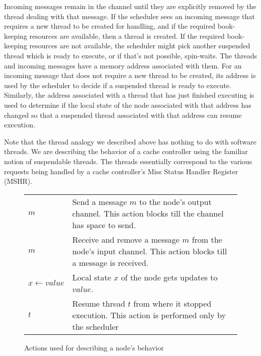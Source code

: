 Incoming messages remain in the channel until they are explicitly removed by
the thread dealing with that message. If the scheduler sees an incoming message
that requires a new thread to be created for handling, and if the required
book-keeping resources are available, then a thread is created.
If the
required book-keeping resources are not available, the scheduler might pick
another suspended thread which is ready to execute, or if that's not possible,
spin-waits.  The threads and incoming messages have a memory address associated
with them. For an incoming message that does not require a new thread to be
created, its address is used by the scheduler to decide if a suspended thread
is ready to execute. Similarly, the address associated with a thread that has
just finished executing is used to determine if the local state of the node
associated with that address has changed so that a suspended thread associated
with that address can resume execution.  

Note that the thread analogy we described above has nothing to do with software
threads. We are describing the behavior of a cache controller using the familiar
notion of suspendable threads. The threads essentially correspond to the various
requests being handled by a cache controller's Miss Status Handler Register
(MSHR).

\begin{figure}
\begin{tabularx}{\linewidth}{|l|X|}
\hline
\send{} $m$ & Send a message $m$ to the node's output channel. This action
blocks till the channel has space to send.\\
\receive{} $m$ & Receive and remove a message $m$ from the node's input channel.
This action blocks till a message is received.\\
$x \gets value$ & Local state $x$ of the node gets updates to $value$.\\
\resume{} $t$ & Resume thread $t$ from where it stopped execution. This action
is performed only by the scheduler\\
\hline
\end{tabularx}
\caption{Actions used for describing a node's behavior}
\label{actions}
\end{figure}

